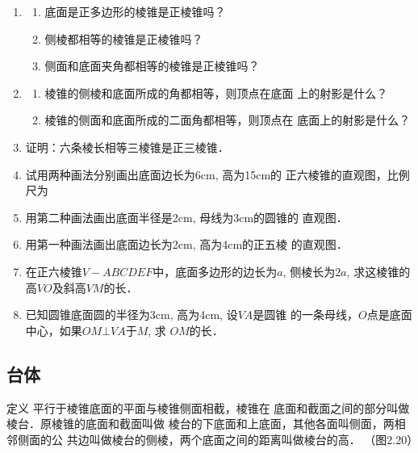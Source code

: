 \begin{ex}
\begin{enumerate}
    \item \begin{enumerate}
        \item 底面是正多边形的棱锥是正棱锥吗？
    \item 侧棱都相等的棱锥是正棱锥吗？
    \item 侧面和底面夹角都相等的棱锥是正棱锥吗？
    \end{enumerate}
  
    \item 
    \begin{enumerate}
      \item 棱锥的侧棱和底面所成的角都相等，则顶点在底面
    上的射影是什么？
    \item 棱锥的侧面和底面所成的二面角都相等，则顶点在
    底面上的射影是什么？  
    \end{enumerate}
    
    \item 证明：六条棱长相等三棱锥是正三棱锥．
    \item 试用两种画法分别画出底面边长为6cm, 高为15cm的
    正六棱锥的直观图，比例尺为
    \item 用第二种画法画出底面半径是2cm, 母线为3cm的圆锥的
    直观图．
    \item 用第一种画法画出底面边长为2cm, 高为4cm的正五棱
    的直观图．
    \item 在正六棱锥$V-ABCDEF$中，底面多边形的边长为$a$,
    侧棱长为$2a$, 求这棱锥的高$VO$及斜高$VM$的长．
    \item 已知圆锥底面圆的半径为3cm, 高为4cm, 设$VA$是圆锥
    的一条母线，$O$点是底面中心，如果$OM\bot VA$于$M$, 求
    $OM$的长．
\end{enumerate}
\end{ex}

\subsection{台体}
\begin{blk}{定义}
    平行于棱锥底面的平面与棱锥侧面相截，棱锥在
底面和截面之间的部分叫做棱台．原棱锥的底面和截面叫做
棱台的下底面和上底面，其他各面叫侧面，两相邻侧面的公
共边叫做棱台的侧棱，两个底面之间的距离叫做棱台的高．
（图2.20）
\end{blk}


